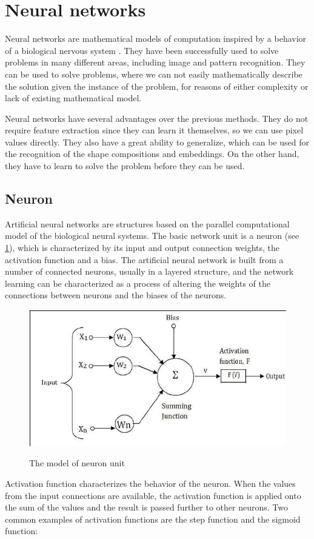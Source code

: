 \section{Neural networks}
Neural networks are mathematical models of computation inspired by a behavior of a biological nervous system \cite{bishop}. They have been successfully used to solve problems in many different areas, including image and pattern recognition. They can be used to solve problems, where we can not easily mathematically describe the solution given the instance of the problem, for reasons of either complexity or lack of existing mathematical model.

Neural networks have several advantages over the previous methods. They do not require feature extraction since they can learn it themselves, so we can use pixel values directly. They also have a great ability to generalize, which can be used for the recognition of the shape compositions and embeddings. On the other hand, they have to learn to solve the problem before they can be used.

\subsection{Neuron}
Artificial neural networks are structures based on the parallel computational model of the biological neural systems. The basic network unit is a neuron (see \cref{fig:neuron}), which is characterized by its input and output connection weights, the activation function and a bias. The artificial neural network is built from a number of connected neurons, usually in a layered structure, and the network learning can be characterized as a process of altering the weights of the connections between neurons and the biases of the neurons. 

\begin{figure}
\centering
\includegraphics[width=.5\linewidth]{ext/neuron.png}
\label{fig:neuron}
\caption{The model of neuron unit}
\end{figure}

Activation function characterizes the behavior of the neuron. When the values from the input connections are available, the activation function is applied onto the sum of the values and the result is passed further to other neurons. Two common examples of activation functions are the step function and the sigmoid function:

